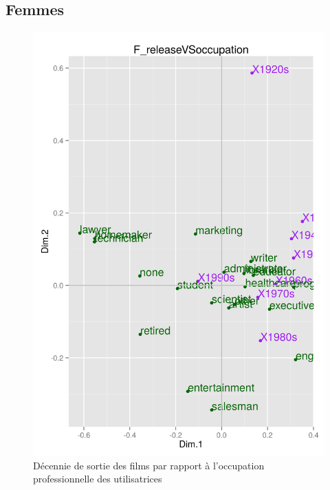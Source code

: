 \documentclass[11pt]{article}
\begin{document}
\subsection{Femmes}
\begin{figure}[htd]
\centering
\includegraphics[scale=0.65]{./images/F_releaseVSoccupation}
\caption{Décennie de sortie des films par rapport à l'occupation professionnelle des utilisatrices}
\end{figure}

\pagebreak
\end{document}
